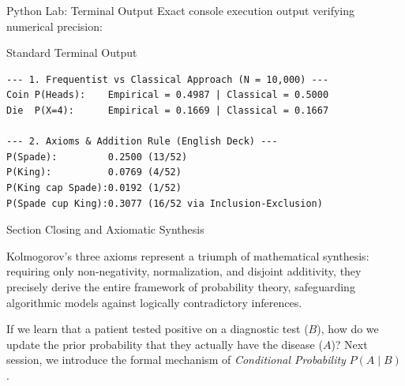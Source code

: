 \documentclass[10pt,aspectratio=169]{beamer}
\begin{document}
\begin{frame}[fragile]{Python Lab: Terminal Output}
  Exact console execution output verifying numerical precision:
  \vspace{0.2em}
  \begin{block}{Standard Terminal Output}
    \fontsize{6.5pt}{7.5pt}\selectfont
    \begin{verbatim}
--- 1. Frequentist vs Classical Approach (N = 10,000) ---
Coin P(Heads):    Empirical = 0.4987 | Classical = 0.5000
Die  P(X=4):      Empirical = 0.1669 | Classical = 0.1667

--- 2. Axioms & Addition Rule (English Deck) ---
P(Spade):         0.2500 (13/52)
P(King):          0.0769 (4/52)
P(King cap Spade):0.0192 (1/52)
P(Spade cup King):0.3077 (16/52 via Inclusion-Exclusion)
    \end{verbatim}
  \end{block}
\end{frame}

\begin{frame}{Section Closing and Axiomatic Synthesis}
  \begin{reflexion}
    Kolmogorov's three axioms represent a triumph of mathematical synthesis: requiring only non-negativity, normalization, and disjoint additivity, they precisely derive the entire framework of probability theory, safeguarding algorithmic models against logically contradictory inferences.
  \end{reflexion}

  \vspace{0.5em}
  \pause
  \begin{retoclase}
    If we learn that a patient tested positive on a diagnostic test ($B$), how do we update the prior probability that they actually have the disease ($A$)? Next session, we introduce the formal mechanism of \emph{Conditional Probability} $P(A \mid B)$.
  \end{retoclase}
\end{frame}
\end{document}
